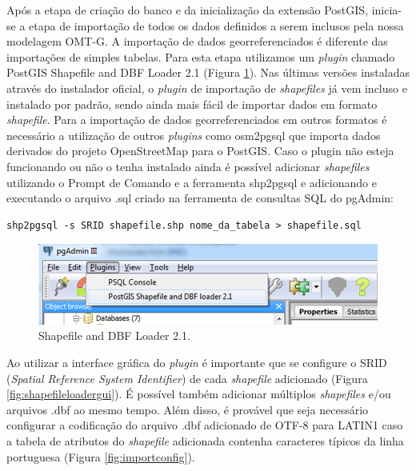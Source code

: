 Após a etapa de criação do banco e da inicialização da extensão PostGIS, inicia-se a etapa de importação de todos os dados definidos a serem inclusos pela nossa modelagem OMT-G. A importação de dados georreferenciados é diferente das importações de simples tabelas. Para esta etapa utilizamos um \textit{plugin} chamado PostGIS Shapefile and DBF Loader 2.1 (Figura \ref{fig:shapefileloader}). Nas últimas versões instaladas através do instalador oficial, o \textit{plugin} de importação de \textit{shapefiles} já vem incluso e instalado por padrão, sendo ainda mais fácil de importar dados em formato \textit{shapefile}. Para a importação de dados georreferenciados em outros formatos é necessário a utilização de outros \textit{plugins} como osm2pgsql que importa dados derivados do projeto OpenStreetMap para o PostGIS. Caso o plugin não esteja funcionando ou não o tenha instalado ainda é possível adicionar \textit{shapefiles} utilizando o Prompt de Comando e a ferramenta shp2pgsql e adicionando e executando o arquivo .sql criado na ferramenta de consultas SQL do pgAdmin:

	\begin{lstlisting}[float,floatplacement=H]
		shp2pgsql -s SRID shapefile.shp nome_da_tabela > shapefile.sql
	\end{lstlisting}

	\begin{figure}
		\centering
		\includegraphics[width=1\linewidth]{data/shapefile_loader}
		\caption{Shapefile and DBF Loader 2.1.}
		\label{fig:shapefileloader}
	\end{figure}
	
Ao utilizar a interface gráfica do \textit{plugin} é importante que se configure o SRID (\textit{Spatial Reference System Identifier}) de cada \textit{shapefile} adicionado (Figura \ref{fig:shapefileloadergui}). É possível também adicionar múltiplos \textit{shapefiles} e/ou arquivos .dbf ao mesmo tempo. Além disso, é provável que seja necessário configurar a codificação do arquivo .dbf adicionado de OTF-8 para LATIN1 caso a tabela de atributos do \textit{shapefile} adicionada contenha caracteres típicos da linha portuguesa (Figura \ref{fig:importconfig}).


